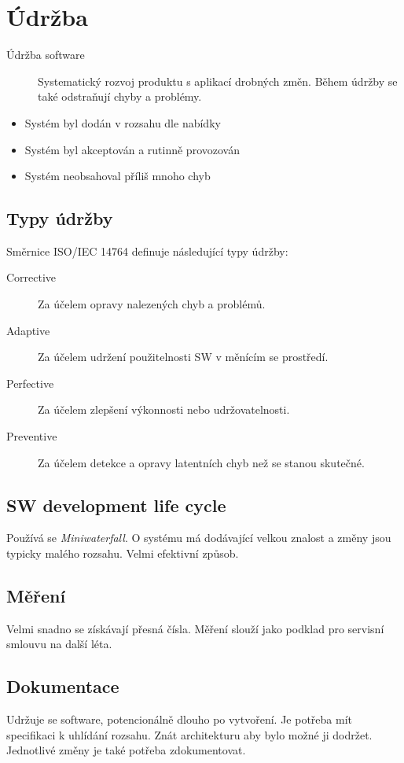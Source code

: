 \section{Údržba}
  \begin{description}
    \item[Údržba software] Systematický rozvoj produktu s aplikací drobných změn. Během údržby se také odstraňují chyby a problémy.
  \end{description}

  \begin{itemize}
    \item Systém byl dodán v rozsahu dle nabídky
    \item Systém byl akceptován a rutinně provozován
    \item Systém neobsahoval příliš mnoho chyb
  \end{itemize}

  \subsection{Typy údržby}
    Směrnice ISO/IEC 14764 definuje následující typy údržby:

    \begin{description}
      \item[Corrective] Za účelem opravy nalezených chyb a problémů.
      \item[Adaptive] Za účelem udržení použitelnosti SW v měnícím se prostředí.
      \item[Perfective] Za účelem zlepšení výkonnosti nebo udržovatelnosti.
      \item[Preventive] Za účelem detekce a opravy latentních chyb než se stanou skutečné.
    \end{description}

  \subsection{SW development life cycle}
    Používá se \emph{Miniwaterfall}. O systému má dodávající velkou znalost a změny jsou typicky malého rozsahu.
    Velmi efektivní způsob.

  \subsection{Měření}
    Velmi snadno se získávají přesná čísla. Měření slouží jako podklad pro servisní smlouvu na další léta.

  \subsection{Dokumentace}
    Udržuje se software, potencionálně dlouho po vytvoření. Je potřeba mít specifikaci k uhlídání rozsahu.
    Znát architekturu aby bylo možné ji dodržet. Jednotlivé změny je také potřeba zdokumentovat.

